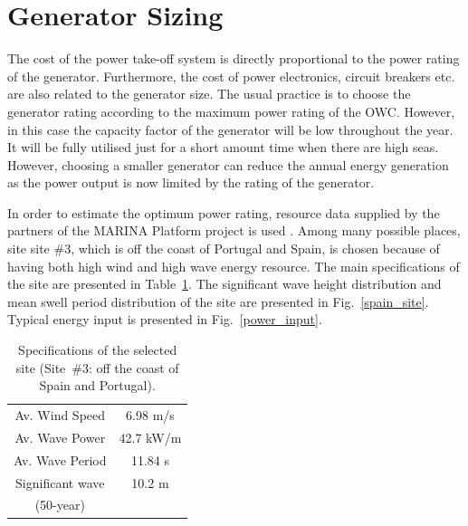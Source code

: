 \documentclass[twocolumn]{article}
\begin{document}
\section{Generator Sizing}

The cost of the power take-off system is directly proportional to the power rating of the generator. Furthermore, the cost of power electronics, circuit breakers etc. are also related to the generator size. The usual practice is to choose the generator rating according to the maximum power rating of the OWC. However, in this case the capacity factor of the generator will be low throughout the year. It will be fully utilised just for a short amount time when there are high seas. However, choosing a smaller generator can reduce the annual energy generation as the power output is now limited by the rating of the generator.

In order to estimate the optimum power rating, resource data supplied by the partners of the MARINA Platform project is used \cite{Gao2012}. Among many possible places, site site \#3, which is off the coast of Portugal and Spain, is chosen because of having both high wind and high wave energy resource. The main specifications of the site are presented in Table~\ref{site_spec}. The significant wave height distribution and mean swell period distribution of the site are presented in Fig.~\ref{spain_site}. Typical energy input is presented in Fig.~\ref{power_input}.

\begin{table}
  \centering
  \begin{tabular}{cc}
    \hline
Av. Wind Speed & 6.98 m/s \\
Av. Wave Power & 42.7 kW/m \\
Av. Wave Period & 11.84 s \\
Significant wave & 10.2 m  \\
(50-year) \\
\hline
  \end{tabular}
  \caption{Specifications of the selected site (Site~\#3: off the coast of Spain and Portugal)\cite{Gao2012}.}
  \label{site_spec}
\end{table}
\end{document}
